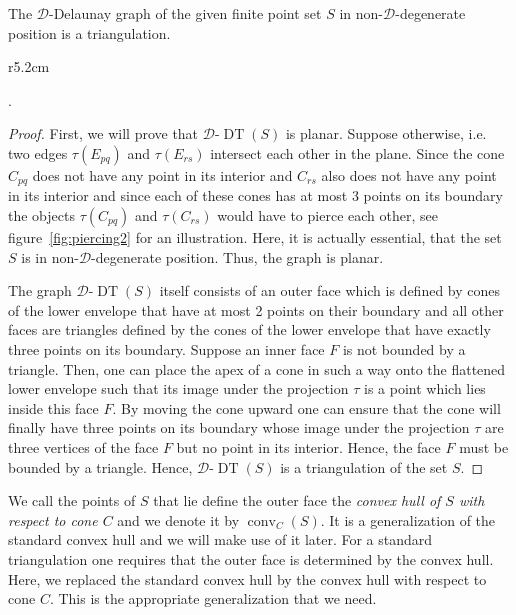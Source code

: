 \documentclass{stacs_proc}
\newcommand{\D}{\mathcal{D}}
\DeclareMathOperator{\DT}{DT}
\DeclareMathOperator{\con}{conv}
\begin{document}
\begin{lemma}
  \label{lem:tria}
  The $\D$-Delaunay graph of the given finite point set $S$ in
  non-$\D$-degenerate position is a triangulation.  
\end{lemma}
\begin{wrapfigure}[13]{r}{5.2cm}
    \vspace{-4ex}
  \begin{center}
    \caption{Two intersecting $\D$-Delaunay edges and their defining
      objects} 
    \label{fig:piercing2}
  \end{center}
\end{wrapfigure}
.\vspace{-4ex}
\begin{proof}
  First, we will prove that $\D$-$\DT(S)$ is planar. Suppose
  otherwise, i.e. two edges $\tau(E_{pq})$ and $\tau(E_{rs})$ intersect each
  other in the plane. Since the cone $C_{pq}$ does not have any point
  in its interior and $C_{rs}$ also does not have any point in its
  interior and since each of these cones has at most $3$ points on its
  boundary the objects $\tau(C_{pq})$ and $\tau(C_{rs})$ would have to
  pierce each other, see figure~\ref{fig:piercing2} for an
  illustration. Here, it is actually essential, that the set $S$ is in
  non-$\D$-degenerate position. Thus, the graph is planar. 

  The graph $\D$-$\DT(S)$ itself consists of an outer face which is
  defined by cones of the lower envelope that have at most 2 points on
  their boundary and all other faces are triangles defined by the
  cones of the lower envelope that have exactly three points on its
  boundary.  
  Suppose an inner face $F$ is not bounded by a triangle. Then, one
  can place the apex of a cone in such a way onto the flattened lower
  envelope such that its image under the projection $\tau$ is a point
  which lies inside this face $F$. By moving the cone upward one can
  ensure that the cone will finally have three points on its boundary
  whose image under the projection $\tau$ are three vertices of the face
  $F$ but no point in its interior. Hence, the face $F$ must be
  bounded by a triangle.   
  Hence, $\D$-$\DT(S)$ is a triangulation of the set $S$. 
\end{proof}

We call the points of $S$ that lie define the outer face the
\emph{convex hull of $S$ with respect to cone $C$} and we denote it by
$\con_C(S)$. 
It is a generalization of the standard convex hull and we will make
use of it later. 
For a standard triangulation one requires that the outer face is
determined by the convex hull. Here, we replaced the standard convex
hull by the convex hull with respect to cone $C$. This is the
appropriate generalization that we need.  
\end{document}

